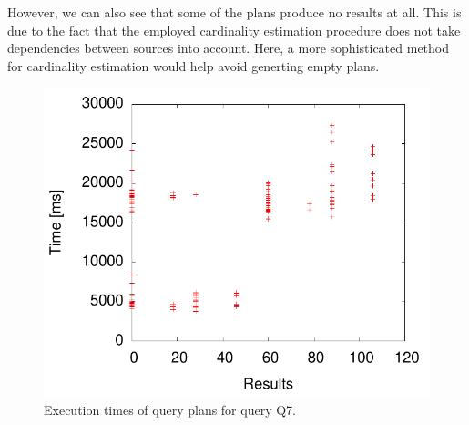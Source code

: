 However, we can also see that some of the plans produce no results at
all. This is due to the fact that the employed cardinality estimation
procedure does not take dependencies between sources into
account. Here, a more sophisticated method for cardinality estimation
would help avoid generting empty plans.

\begin{figure}[htb]
  \centering
  \includegraphics[width=0.8\linewidth]{figs/q7_execution.pdf}
  \caption{Execution times of query plans for query Q7.}
  \label{fig:exec_q7}
\end{figure}
